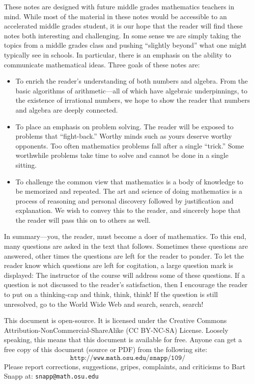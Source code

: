 These notes are designed with future middle grades mathematics
teachers in mind.  While most of the material in these notes would be
accessible to an accelerated middle grades student, it is our hope
that the reader will find these notes both interesting and
challenging.  In some sense we are simply taking the topics from a
middle grades class and pushing ``slightly beyond'' what one might
typically see in schools. In particular, there is an emphasis on the
ability to communicate mathematical ideas.  Three goals of these notes
are:
\begin{itemize}
\item To enrich the reader's understanding of both numbers and algebra. 
From the basic algorithms of arithmetic---all of which have algebraic
underpinnings, to the existence of irrational numbers, we hope to show
the reader that numbers and algebra are deeply connected.
\item To place an emphasis on problem solving. The reader will be exposed 
to problems that ``fight-back.'' Worthy minds such as yours deserve
worthy opponents. Too often mathematics problems fall after a single
``trick.'' Some worthwhile problems take time to solve and cannot be done
in a single sitting.
\item To challenge the common view that mathematics is a body of knowledge 
to be memorized and repeated. The art and science of doing mathematics
is a process of reasoning and personal discovery followed by
justification and explanation. We wish to convey this to the reader,
and sincerely hope that the reader will pass this on to others as
well.
\end{itemize}
In summary---you, the reader, must become a doer of mathematics.  To
this end, many questions are asked in the text that follows. Sometimes
these questions are answered, other times the questions are left for
the reader to ponder. To let the reader know which questions are left
for cogitation, a large question mark is displayed:
\QM
The instructor of the course will address some of these questions. If
a question is not discussed to the reader's satisfaction, then I
encourage the reader to put on a thinking-cap and think, think, think!
If the question is still unresolved, go to the World Wide Web and
search, search, search!

This document is open-source. It is licensed under the Creative
Commons Attribution-NonCommercial-ShareAlike (CC BY-NC-SA)
License. Loosely speaking, this means that this document is available
for free. Anyone can get a free copy of this document (source or PDF)
from the following site:
\[
\texttt{http://www.math.osu.edu/\~{}snapp/109/}
\]
Please report corrections, suggestions, gripes, complaints, and
criticisms to Bart Snapp at: \texttt{snapp@math.osu.edu}


